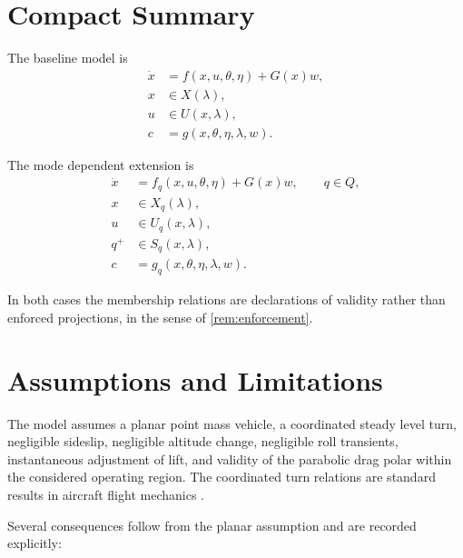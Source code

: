 \documentclass[11pt,a4paper]{article}
\newcommand{\Xset}{X}
\newcommand{\Uset}{U}
\newcommand{\Qset}{Q}
\newcommand{\Sset}{S}
\newcommand{\vecx}{x}
\newcommand{\vecu}{u}
\newcommand{\vecw}{w}
\newcommand{\vecc}{c}
\newcommand{\vectheta}{\theta}
\newcommand{\veceta}{\eta}
\newcommand{\veclambda}{\lambda}
\newcommand{\vecf}{f}
\newcommand{\vecg}{g}
\newcommand{\matG}{G}
\begin{document}
\section{Compact Summary}

The baseline model is
\begin{equation}
  \begin{aligned}
    \dot{\vecx} &= \vecf(\vecx, \vecu, \vectheta, \veceta) + \matG(\vecx)\vecw, \\
    \vecx &\in \Xset(\veclambda), \\
    \vecu &\in \Uset(\vecx, \veclambda), \\
    \vecc &= \vecg(\vecx, \vectheta, \veceta, \veclambda, \vecw).
  \end{aligned}
\end{equation}

The mode dependent extension is
\begin{equation}
  \begin{aligned}
    \dot{\vecx} &= \vecf_q(\vecx, \vecu, \vectheta, \veceta) + \matG(\vecx)\vecw,
      \qquad q \in \Qset, \\
    \vecx &\in \Xset_q(\veclambda), \\
    \vecu &\in \Uset_q(\vecx, \veclambda), \\
    q^{+} &\in \Sset_q(\vecx, \veclambda), \\
    \vecc &= \vecg_q(\vecx, \vectheta, \veceta, \veclambda, \vecw).
  \end{aligned}
\end{equation}

In both cases the membership relations are declarations of validity rather than
enforced projections, in the sense of \cref{rem:enforcement}.

\section{Assumptions and Limitations}

The model assumes a planar point mass vehicle, a coordinated steady level turn,
negligible sideslip, negligible altitude change, negligible roll transients,
instantaneous adjustment of lift, and validity of the parabolic drag polar within
the considered operating region. The coordinated turn relations are standard
results in aircraft flight mechanics \cite{faa-phak}.

Several consequences follow from the planar assumption and are recorded
explicitly:
\end{document}
